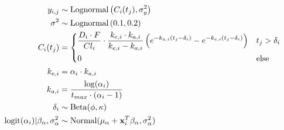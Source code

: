 \begin{align}\label{model_M1}
	y_{i,j} &\sim \operatorname{Lognormal}  \left(  C_i(t_j)  , \sigma^2_y \right)  \\
	\sigma^2 &\sim \operatorname{Lognormal} \left( 0.1, 0.2 \right)\\	
	C_i(t_j) &= \begin{dcases}
	\frac{D_{i} \cdot F}{C l_{i}} \cdot \frac{k_{e, i} \cdot k_{a, i}}{k_{e, i}-k_{a, i}}\left(e^{-k_{a, i}\left(t_{j}-\delta_{i}\right)}-e^{-k_{e, i}\left(t_{j}-\delta_{i}\right)}\right) & t_j>\delta_i \\
	0 & \mbox{else}
	\end{dcases}\\
	k_{e,i} &= \alpha_i \cdot k_{a,i}\\
	k_{a,i} &= \dfrac{\log(\alpha_i)}{t_{max}\cdot(\alpha_i-1)}\\
	\delta_i &\sim \operatorname{Beta}(\phi, \kappa) \\
	\operatorname{logit}(\alpha_i) \vert \beta_\alpha, \sigma^2_\alpha &\sim \operatorname{Normal}(\mu_\alpha + \mathbf{x}_i^T \beta_\alpha, \sigma^2_\alpha)
\end{align}

